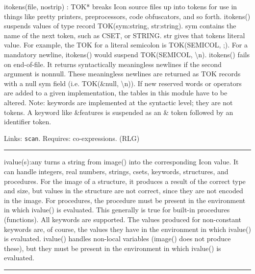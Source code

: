 \textsf{itokens(file, nostrip) : TOK*} breaks Icon source files up into
tokens for use in things like pretty printers, preprocessors, code
obfuscators, and so forth. itokens() suspends values of type
\textsf{record TOK(sym:string, str:string). sym} contains the name of
the next token, such as \textsf{{\textquotedbl}CSET{\textquotedbl}}, or
\textsf{{\textquotedbl}STRING{\textquotedbl}. str} gives that
token{\textquotesingle}s literal value. For example, the \textsf{TOK}
for a literal semicolon is
\textsf{TOK({\textquotedbl}SEMICOL{\textquotedbl},
{\textquotedbl};{\textquotedbl})}. For a mandatory newline,
\textsf{itokens()} would suspend
\textsf{TOK({\textquotedbl}SEMICOL{\textquotedbl},
{\textquotedbl}{\textbackslash}n{\textquotedbl}). itokens()} fails on
end-of-file. It returns syntactically meaningless newlines if the
second argument is nonnull. These meaningless newlines are returned as
TOK records with a null sym field (i.e. \textsf{TOK(\&null,
{\textquotedbl}{\textbackslash}n{\textquotedbl})}). If new reserved
words or operators are added to a given implementation, the tables in
this module have to be altered. Note: keywords are implemented at the
syntactic level; they are not tokens. A keyword like
\textsf{\&features} is suspended as an \textsf{\&} token followed by an
identifier token.

Links: \texttt{scan}. Requires: co-expressions. (RLG)

\vspace{0.25cm}\hrule{}

\textsf{ivalue(s):any} turns a string from \textsf{image()} into the
corresponding Icon value. It can handle integers, real numbers,
strings, csets, keywords, structures, and procedures. For the image of
a structure, it produces a result of the correct type and size, but
values in the structure are not correct, since they are not encoded in
the image. For procedures, the procedure must be present in the
environment in which \textsf{ivalue()} is evaluated. This generally is
true for built-in procedures (functions). All keywords are supported.
The values produced for non-constant keywords are, of course, the
values they have in the environment in which \textsf{ivalue()} is
evaluated. \textsf{ivalue()} handles non-local variables
(\textsf{image()} does not produce these), but they must be present in
the environment in which \textsf{ivalue()} is evaluated. 

\vspace{0.25cm}\hrule{}

